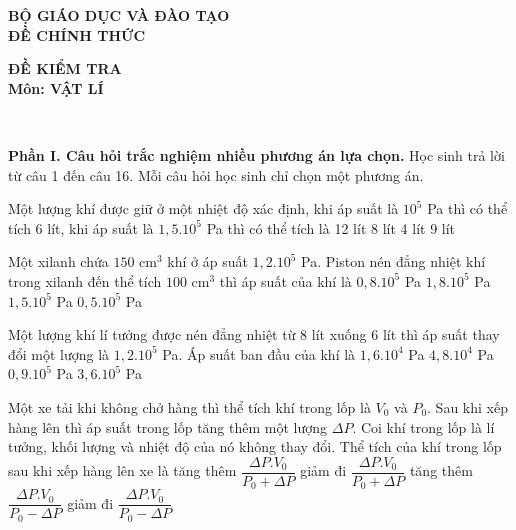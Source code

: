 \documentclass[12pt,a4paper]{article}
\begin{document}
\begin{minipage}[t]{7cm}
	\begin{center}
		\textbf{BỘ GIÁO DỤC VÀ ĐÀO TẠO \\[3pt]
		ĐỀ CHÍNH THỨC}
	\end{center}
\end{minipage}
\hspace{3cm}
\begin{minipage}[t]{7cm}
	\begin{center}
		\textbf{ĐỀ KIỂM TRA\\[3pt]
		Môn: VẬT LÍ}
	\end{center}
\end{minipage}\\[6pt]

\begin{multicols}{2}	
	\textbf{Phần I. Câu hỏi trắc nghiệm nhiều phương án lựa chọn.} Học sinh trả lời từ câu 1 đến câu 16. Mỗi câu hỏi học sinh chỉ chọn một phương án.
	
	\begin{ex}
		Một lượng khí được giữ ở một nhiệt độ xác định, khi áp suất là $10^5$ Pa thì có thể tích 6 lít, khi áp suất là $1,5.10^5$ Pa thì có thể tích là
		\choice
		{12 lít}
		{8 lít}
		{4 lít}
		{9 lít}
	\end{ex}
	
	\begin{ex}
		Một xilanh chứa $150 \text{ cm}^3$ khí ở áp suất $1,2.10^5$ Pa. Piston nén đẳng nhiệt khí trong xilanh đến thể tích $100 \text{ cm}^3$ thì áp suất của khí là
		\choice
		{$0,8.10^5$ Pa}
		{$1,8.10^5$ Pa}
		{$1,5.10^5$ Pa}
		{$0,5.10^5$ Pa}
	\end{ex}
	
	\begin{ex}
		Một lượng khí lí tưởng được nén đẳng nhiệt từ 8 lít xuống 6 lít thì áp suất thay đổi một lượng là $1,2.10^5$ Pa. Áp suất ban đầu của khí là
		\choice
		{$1,6.10^4$ Pa}
		{$4,8.10^4$ Pa}
		{$0,9.10^5$ Pa}
		{$3,6.10^5$ Pa}
	\end{ex}
	
	\begin{ex}
		Một xe tải khi không chở hàng thì thể tích khí trong lốp là $V_0$ và $P_0$. Sau khi xếp hàng lên thì áp suất trong lốp tăng thêm một lượng $\Delta P$. Coi khí trong lốp là lí tưởng, khối lượng và nhiệt độ của nó không thay đổi. Thể tích của khí trong lốp sau khi xếp hàng lên xe là
		\choice
		{tăng thêm $\dfrac{\Delta P.V_0}{P_0 + \Delta P}$}
		{giảm đi $\dfrac{\Delta P.V_0}{P_0 + \Delta P}$}
		{tăng thêm $\dfrac{\Delta P.V_0}{P_0 - \Delta P}$}
		{giảm đi $\dfrac{\Delta P.V_0}{P_0 - \Delta P}$}
	\end{ex}
	

\end{multicols}
\end{document}

